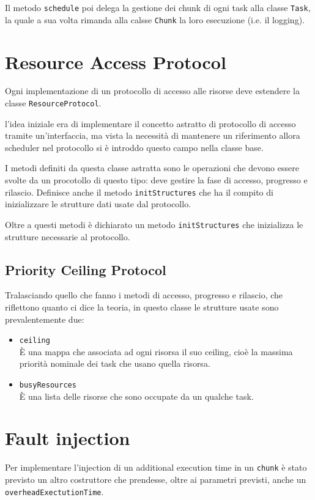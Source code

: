 \myskip

Il metodo \texttt{schedule} poi delega la gestione dei chunk di ogni task alla classe \texttt{Task}, la quale a sua volta rimanda alla calsse \texttt{Chunk} la loro esecuzione (i.e. il logging).

\section{Resource Access Protocol}
Ogni implementazione di un protocollo di accesso alle risorse deve estendere la classe \texttt{ResourceProtocol}.

l'idea iniziale era di implementare il concetto astratto di protocollo di accesso tramite un'interfaccia, ma vista la necessità di mantenere un riferimento allora scheduler nel protocollo si è introddo questo campo nella classe base.

\myskip

I metodi definiti da questa classe astratta sono le operazioni che devono essere svolte da un procotollo di questo tipo: deve gestire la fase di accesso, progresso e rilascio. Definisce anche il metodo \texttt{initStructures} che ha il compito di inizializzare le strutture dati usate dal protocollo.

Oltre a questi metodi è dichiarato un metodo \texttt{initStructures} che inizializza le strutture necessarie al protocollo.

\subsection{Priority Ceiling Protocol}
Tralasciando quello che fanno i metodi di accesso, progresso e rilascio, che riflettono quanto ci dice la teoria, in questo classe le strutture usate sono prevalentemente due:
\begin{itemize}
    \item \texttt{ceiling} \\
        È una mappa che associata ad ogni risorsa il suo ceiling, cioè la massima priorità nominale dei task che usano quella risorsa.
    \item \texttt{busyResources}\\
        È una lista delle risorse che sono occupate da un qualche task.
\end{itemize}

\section{Fault injection}
Per implementare l'injection di un additional execution time in un \texttt{chunk} è stato previsto un altro costruttore che prendesse, oltre ai parametri previsti, anche un \texttt{overheadExectutionTime}.

